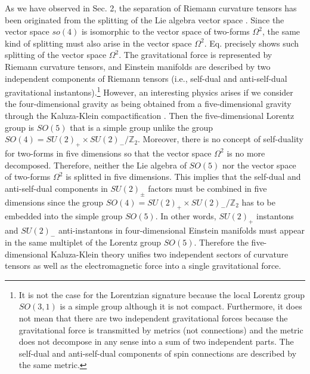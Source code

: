 \documentclass[12pt,epsf]{article}
\begin{document}
As we have observed in Sec. 2, the separation of Riemann curvature tensors
has been originated from the splitting of the Lie algebra vector space .
Since the vector space $so(4)$ is isomorphic to the vector space of two-forms $\Omega^2$,
the same kind of splitting must also arise in the vector space $\Omega^2$.
Eq.  precisely shows such splitting of the vector space $\Omega^2$.
The gravitational force is represented by Riemann curvature tensors, and Einstein manifolds
are described by two independent components of Riemann tensors (i.e., self-dual and anti-self-dual
gravitational instantons).\footnote{It is not the case for the Lorentzian signature
because the local Lorentz group $SO(3,1)$ is a simple group although it is not compact.
Furthermore, it does not mean that there are two independent gravitational forces because the gravitational force
is transmitted by metrics (not connections) and the metric does not decompose in any sense into a sum of two independent parts.
The self-dual and anti-self-dual components of spin connections are described by the same metric.}
However, an interesting physics arises if we consider the four-dimensional gravity as being obtained
from a five-dimensional gravity through the Kaluza-Klein compactification \cite{kk-book}.
Then the five-dimensional Lorentz group is $SO(5)$ that is a simple group unlike the group
$SO(4)= SU(2)_+ \times SU(2)_-/\mathbb{Z}_2$. Moreover, there is no concept of self-duality for two-forms
in five dimensions so that the vector space $\Omega^2$ is no more decomposed.
Therefore, neither the Lie algebra of $SO(5)$ nor the vector space of two-forms $\Omega^2$ is splitted in five dimensions.
This implies that the self-dual and anti-self-dual components in $SU(2)_\pm$ factors must be combined in five dimensions
since the group $SO(4) = SU(2)_+ \times SU(2)_-/\mathbb{Z}_2$
has to be embedded into the simple group $SO(5)$.
In other words, $SU(2)_+$ instantons and $SU(2)_-$ anti-instantons in four-dimensional Einstein manifolds
must appear in the same multiplet of the Lorentz group $SO(5)$.
Therefore the five-dimensional Kaluza-Klein theory unifies two independent sectors of curvature tensors
as well as the electromagnetic force into a single gravitational force.
\end{document}
